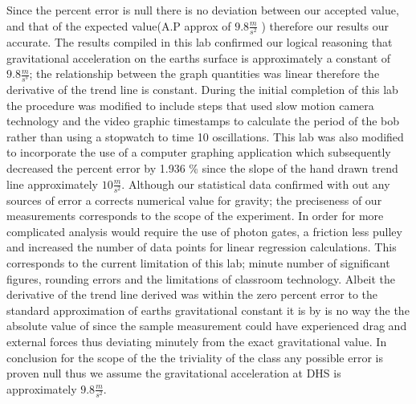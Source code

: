 \documentclass[11pt,letterpaper]{article}
\begin{document}
\\\\ Since the percent error is null there is no deviation between our accepted value, and that of the expected value(A.P approx of $9.8\frac{m}{s^2} $ ) therefore our results our accurate. The results compiled in this lab confirmed our logical reasoning that gravitational acceleration on the earths surface is approximately a constant of $9.8\frac{m}{s^s}$; the relationship between the graph quantities was linear therefore the derivative of the trend line is constant. During the initial completion of this lab the procedure was modified to include steps that used slow motion camera technology and the video graphic timestamps to calculate the period of the bob rather than using a stopwatch to time 10 oscillations.  This lab was also modified to incorporate the use of a computer graphing application which subsequently decreased the percent error by 1.936 \% since the slope of the hand drawn trend line approximately $10 \frac{m}{s^2}$. Although our statistical data confirmed with out any sources of error a corrects numerical value for gravity; the preciseness of our measurements corresponds to the scope of the experiment. In order for more complicated analysis would require the use of photon gates,  a friction less pulley and increased the number of data points for linear regression calculations. This corresponds to the current limitation of this lab; minute number of significant figures, rounding errors and the limitations of classroom technology. Albeit the derivative of the trend line derived was within the zero percent error to the standard approximation of earths gravitational constant it is by is no way the the absolute value of since the sample measurement could have experienced drag and external forces thus deviating minutely from the exact gravitational value.  In conclusion for the scope of the the triviality of the class any possible error is proven null thus we assume the  gravitational acceleration at DHS is approximately $9.8\frac{m}{s^2} $.
\end{document}
